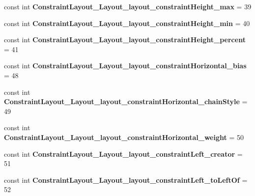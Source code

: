 \begin{DoxyCompactItemize}
const int {\bfseries Constraint\+Layout\+\_\+\+Layout\+\_\+layout\+\_\+constraint\+Height\+\_\+max} = 39
\item 
\mbox{\label{classst_delivery_1_1_resource_1_1_styleable_a86486df5975b293c860a30663145c96e}} 
const int {\bfseries Constraint\+Layout\+\_\+\+Layout\+\_\+layout\+\_\+constraint\+Height\+\_\+min} = 40
\item 
\mbox{\label{classst_delivery_1_1_resource_1_1_styleable_aadc343152e7aa1d8a40aac22e4fa096a}} 
const int {\bfseries Constraint\+Layout\+\_\+\+Layout\+\_\+layout\+\_\+constraint\+Height\+\_\+percent} = 41
\item 
\mbox{\label{classst_delivery_1_1_resource_1_1_styleable_afda8e6b5e017e18e4bb56a9cc21d43fb}} 
const int {\bfseries Constraint\+Layout\+\_\+\+Layout\+\_\+layout\+\_\+constraint\+Horizontal\+\_\+bias} = 48
\item 
\mbox{\label{classst_delivery_1_1_resource_1_1_styleable_a40784b0f696c3325c8c12402210efa47}} 
const int {\bfseries Constraint\+Layout\+\_\+\+Layout\+\_\+layout\+\_\+constraint\+Horizontal\+\_\+chain\+Style} = 49
\item 
\mbox{\label{classst_delivery_1_1_resource_1_1_styleable_a38038fba5d934868437fef0ff8e0cc3c}} 
const int {\bfseries Constraint\+Layout\+\_\+\+Layout\+\_\+layout\+\_\+constraint\+Horizontal\+\_\+weight} = 50
\item 
\mbox{\label{classst_delivery_1_1_resource_1_1_styleable_a7c6b296f8181865c1635d5ea671e7589}} 
const int {\bfseries Constraint\+Layout\+\_\+\+Layout\+\_\+layout\+\_\+constraint\+Left\+\_\+creator} = 51
\item 
\mbox{\label{classst_delivery_1_1_resource_1_1_styleable_a3b41937483e564186bca35675903c5b0}} 
const int {\bfseries Constraint\+Layout\+\_\+\+Layout\+\_\+layout\+\_\+constraint\+Left\+\_\+to\+Left\+Of} = 52
\item 
\mbox{\label{classst_delivery_1_1_resource_1_1_styleable_a2906da515d8950a414ac48f36d2cf411}} 

\end{DoxyCompactItemize}
